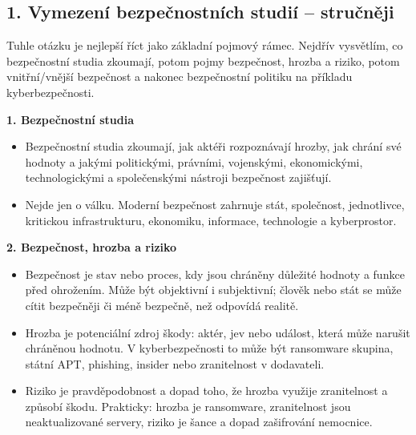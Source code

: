 
\subsection*{1. Vymezení bezpečnostních studií -- stručněji}
Tuhle otázku je nejlepší říct jako základní pojmový rámec. Nejdřív vysvětlím, co bezpečnostní studia zkoumají, potom pojmy bezpečnost, hrozba a riziko, potom vnitřní/vnější bezpečnost a nakonec bezpečnostní politiku na příkladu kyberbezpečnosti.

\textbf{1. Bezpečnostní studia}
\begin{itemize}
  \item Bezpečnostní studia zkoumají, jak aktéři rozpoznávají hrozby, jak chrání své hodnoty a jakými politickými, právními, vojenskými, ekonomickými, technologickými a společenskými nástroji bezpečnost zajišťují.
  \item Nejde jen o válku. Moderní bezpečnost zahrnuje stát, společnost, jednotlivce, kritickou infrastrukturu, ekonomiku, informace, technologie a kyberprostor.
\end{itemize}

\textbf{2. Bezpečnost, hrozba a riziko}
\begin{itemize}
  \item Bezpečnost je stav nebo proces, kdy jsou chráněny důležité hodnoty a funkce před ohrožením. Může být objektivní i subjektivní; člověk nebo stát se může cítit bezpečněji či méně bezpečně, než odpovídá realitě.
  \item Hrozba je potenciální zdroj škody: aktér, jev nebo událost, která může narušit chráněnou hodnotu. V kyberbezpečnosti to může být ransomware skupina, státní APT, phishing, insider nebo zranitelnost v dodavateli.
  \item Riziko je pravděpodobnost a dopad toho, že hrozba využije zranitelnost a způsobí škodu. Prakticky: hrozba je ransomware, zranitelnost jsou neaktualizované servery, riziko je šance a dopad zašifrování nemocnice.
\end{itemize}

